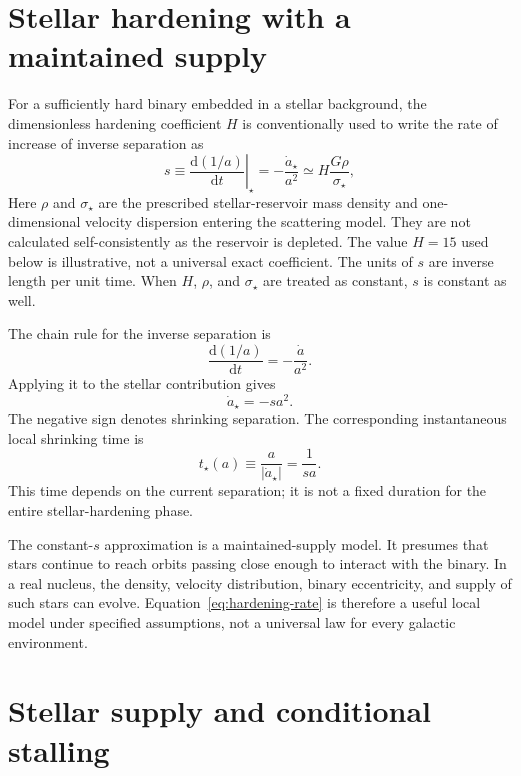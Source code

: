\documentclass[12pt]{article}
\begin{document}
\section{Stellar hardening with a maintained supply}

For a sufficiently hard binary embedded in a stellar background, the dimensionless hardening coefficient $H$ is conventionally used to write the rate of increase of inverse separation as \cite{Quinlan}
\begin{equation}
  s\equiv\left.\frac{\mathrm{d}(1/a)}{\mathrm{d}t}\right|_{\star}
  =-\frac{\dot a_\star}{a^2}
  \simeq H\frac{G\rho}{\sigma_\star},
  \label{eq:hardening-rate}
\end{equation}
Here $\rho$ and $\sigma_\star$ are the prescribed stellar-reservoir mass density and one-dimensional velocity dispersion entering the scattering model. They are not calculated self-consistently as the reservoir is depleted. The value $H=15$ used below is illustrative, not a universal exact coefficient. The units of $s$ are inverse length per unit time. When $H$, $\rho$, and $\sigma_\star$ are treated as constant, $s$ is constant as well.

The chain rule for the inverse separation is
\begin{equation}
  \frac{\mathrm{d}(1/a)}{\mathrm{d}t}
  =-\frac{\dot a}{a^2}.
\end{equation}
Applying it to the stellar contribution gives
\begin{equation}
  \dot a_\star=-sa^2.
  \label{eq:stellar-shrink-rate}
\end{equation}
The negative sign denotes shrinking separation. The corresponding instantaneous local shrinking time is
\begin{equation}
  t_\star(a)\equiv\frac{a}{|\dot a_\star|}
  =\frac{1}{sa}.
  \label{eq:stellar-local-time}
\end{equation}
This time depends on the current separation; it is not a fixed duration for the entire stellar-hardening phase.

The constant-$s$ approximation is a maintained-supply model. It presumes that stars continue to reach orbits passing close enough to interact with the binary. In a real nucleus, the density, velocity distribution, binary eccentricity, and supply of such stars can evolve. Equation~\eqref{eq:hardening-rate} is therefore a useful local model under specified assumptions, not a universal law for every galactic environment.

\section{Stellar supply and conditional stalling}
\end{document}
